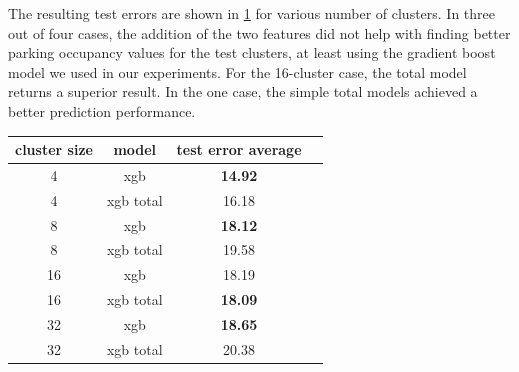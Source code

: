 	The resulting test errors are shown in \cref{tab:extended_models_comparison} for various number of clusters. In three out of four cases, the addition of the two features did not help with finding better parking occupancy values for the test clusters, at least using the gradient boost model we used in our experiments. For the 16-cluster case, the total model returns a superior result. In the one case, the simple total models achieved a better prediction performance. 
	
	\begin{table}[!ht]
		{\begin{tabular}{ | c | c | c | c | }
				\hline		
				\textbf{cluster size}  & \textbf{model} & \textbf{test error average} \\ \hline
				4 & {xgb} & \textbf{14.92} \\ \hline
				4 & {xgb total} & 16.18 \\ \hline \hline
				8 & {xgb} & \textbf{18.12} \\ \hline
				8 & {xgb total} & 19.58 \\ \hline \hline
				16 & {xgb} & 18.19 \\ \hline
				16 & {xgb total} & \textbf{18.09} \\ \hline \hline
				32 & {xgb} & \textbf{18.65} \\ \hline
				32 & {xgb total} & 20.38 \\ \hline
		\end{tabular}}
		\label{tab:extended_models_comparison}
	\end{table}
	
